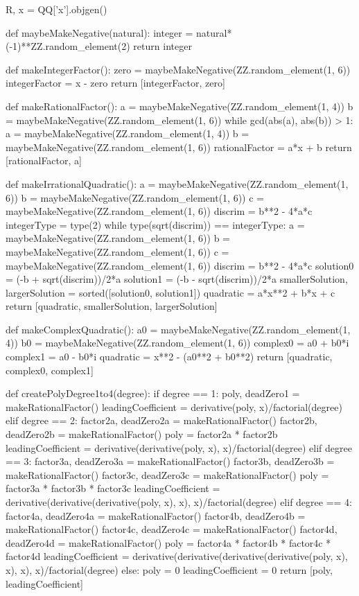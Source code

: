 \documentclass{ximera}
\begin{document}
\begin{sagesilent}
R, x = QQ['x'].objgen()
 
def maybeMakeNegative(natural):
    integer = natural*(-1)**ZZ.random_element(2)
    return integer
 
def makeIntegerFactor():
    zero = maybeMakeNegative(ZZ.random_element(1, 6))
    integerFactor = x - zero
    return [integerFactor, zero]
 
def makeRationalFactor():
    a = maybeMakeNegative(ZZ.random_element(1, 4))
    b = maybeMakeNegative(ZZ.random_element(1, 6))
    while gcd(abs(a), abs(b)) > 1:
        a = maybeMakeNegative(ZZ.random_element(1, 4))
        b = maybeMakeNegative(ZZ.random_element(1, 6))
    rationalFactor = a*x + b
    return [rationalFactor, a]
 
def makeIrrationalQuadratic():
    a = maybeMakeNegative(ZZ.random_element(1, 6))
    b = maybeMakeNegative(ZZ.random_element(1, 6))
    c = maybeMakeNegative(ZZ.random_element(1, 6))
    discrim = b**2 - 4*a*c
    integerType = type(2)
    while type(sqrt(discrim)) == integerType:
        a = maybeMakeNegative(ZZ.random_element(1, 6))
        b = maybeMakeNegative(ZZ.random_element(1, 6))
        c = maybeMakeNegative(ZZ.random_element(1, 6))
        discrim = b**2 - 4*a*c
    solution0 = (-b + sqrt(discrim))/2*a
    solution1 = (-b - sqrt(discrim))/2*a
    smallerSolution, largerSolution = sorted([solution0, solution1])
    quadratic = a*x**2 + b*x + c
    return [quadratic, smallerSolution, largerSolution]
 
def makeComplexQuadratic():
    a0 = maybeMakeNegative(ZZ.random_element(1, 4))
    b0 = maybeMakeNegative(ZZ.random_element(1, 6))
    complex0 = a0 + b0*i
    complex1 = a0 - b0*i
    quadratic = x**2 - (a0**2 + b0**2)
    return [quadratic, complex0, complex1]
 
def createPolyDegree1to4(degree):
    if degree == 1:
        poly, deadZero1 = makeRationalFactor()
        leadingCoefficient = derivative(poly, x)/factorial(degree)
    elif degree == 2:
        factor2a, deadZero2a = makeRationalFactor()
        factor2b, deadZero2b = makeRationalFactor()
        poly = factor2a * factor2b
        leadingCoefficient = derivative(derivative(poly, x), x)/factorial(degree)
    elif degree == 3:
        factor3a, deadZero3a = makeRationalFactor()
        factor3b, deadZero3b = makeRationalFactor()
        factor3c, deadZero3c = makeRationalFactor()
        poly = factor3a * factor3b * factor3c
        leadingCoefficient = derivative(derivative(derivative(poly, x), x), x)/factorial(degree)
    elif degree == 4:
        factor4a, deadZero4a = makeRationalFactor()
        factor4b, deadZero4b = makeRationalFactor()
        factor4c, deadZero4c = makeRationalFactor()
        factor4d, deadZero4d = makeRationalFactor()
        poly = factor4a * factor4b * factor4c * factor4d
        leadingCoefficient = derivative(derivative(derivative(derivative(poly, x), x), x), x)/factorial(degree)
    else:
        poly = 0
        leadingCoefficient = 0
    return [poly, leadingCoefficient]
 

\end{sagesilent}
\end{document}
